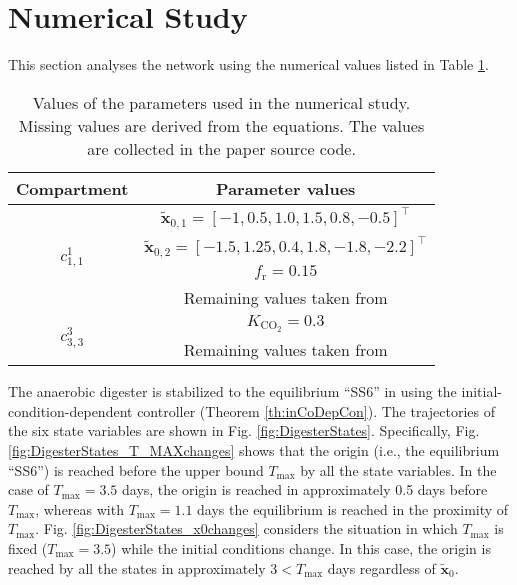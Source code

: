 \documentclass[lettersize,journal]{IEEEtran}
\begin{document}
\section{Numerical Study}\label{sec:numStudy}
This section analyses the network using the numerical values listed in Table \ref{tab:valuesOfParam}. 
\begin{table}
\centering
\caption[Caption for LOF]{Values of the parameters used in the numerical study. Missing values are derived from the equations. The values are collected in the paper source code\footnotemark[\value{footnote}].}
\label{tab:valuesOfParam}
\renewcommand{\arraystretch}{2}
\begin{tabular}{cc} 
\hline
Compartment & Parameter values\\ 
\hline
\hline
\multirow{4}{*}{$c^1_{1,1}$} & $\tilde{\bm{x}}_{0,1} = [-1, 0.5, 1.0, 1.5, 0.8, -0.5]^\top$ \\
& $\tilde{\bm{x}}_{0,2} = [-1.5, 1.25, 0.4, 1.8, -1.8, -2.2]^\top$ \\
& $f_\text{r} = 0.15$ \\
& Remaining values taken from \cite{bernard2001dynamical,campos2019hybrid} \\
\hline 
\multirow{2}{*}{$c^3_{3,3}$} & $K_{\text{CO}_2} = 0.3$ \\
& Remaining values taken from \cite{vatcheva2006experiment,bernard2011hurdles} \\
\hline
\end{tabular}
\renewcommand{\arraystretch}{1}
\end{table}
The anaerobic digester is stabilized to the equilibrium ``SS6'' in \cite{campos2019hybrid} using the initial-condition-dependent controller (Theorem \ref{th:inCoDepCon}). The trajectories of the six state variables are shown in Fig. \ref{fig:DigesterStates}. Specifically, Fig. \ref{fig:DigesterStates_T_MAXchanges} shows that the origin (i.e., the equilibrium ``SS6'') is reached before the upper bound $T_{\text{max}}$ by all the state variables. In the case of $T_{\text{max}} = 3.5$ days, the origin is reached in approximately 0.5 days before $T_{\text{max}}$, whereas with $T_{\text{max}} = 1.1$ days the equilibrium is reached in the proximity of $T_{\text{max}}$. Fig. \ref{fig:DigesterStates_x0changes} considers the situation in which $T_{\text{max}}$ is fixed ($T_{\text{max}} = 3.5$) while the initial conditions change. In this case, the origin is reached by all the states in approximately $ 3 < T_{\text{max}}$ days regardless of $\tilde{\bm{x}}_0$.  
\end{document}
